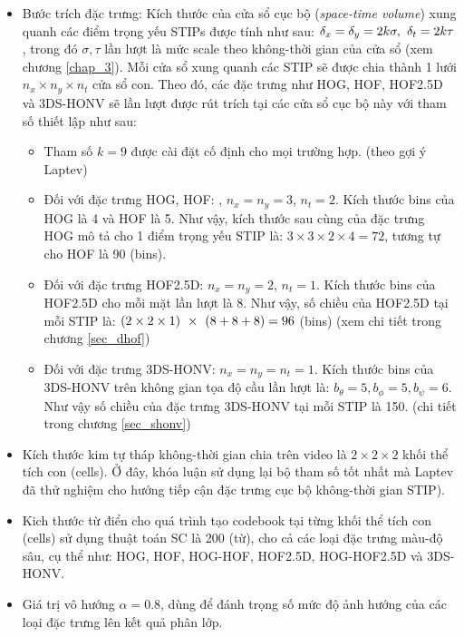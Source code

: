 \begin{itemize}
	\item Bước trích đặc trưng: Kích thước của cửa sổ cục bộ (\textit{space-time volume}) xung quanh các điểm trọng yếu STIPs được tính như sau: $\delta_x=\delta_y=2k\sigma,\hspace{0.05in}\delta_t=2k\tau$, trong đó $\sigma, \tau$ lần lượt là mức scale theo không-thời gian của cửa sổ (xem chương \ref{chap_3}). Mỗi cửa sổ xung quanh các STIP sẽ được chia thành 1 lưới $n_x \times n_y\times n_t$ cửa sổ con. Theo đó, các đặc trưng như HOG, HOF, HOF2.5D và 3DS-HONV sẽ lần lượt được rút trích tại các cửa sổ cục bộ này với tham số thiết lập như sau: 
		\begin{itemize} 
			\item Tham số $k=9$ được cài đặt cố định cho mọi trường hợp. (theo gợi ý Laptev\cite{LMSR08})
			\item Đối với đặc trưng HOG, HOF: , $n_x = n_y = 3$, $n_t = 2$. Kích thước bins của HOG là 4 và HOF là 5. Như vậy, kích thước sau cùng của đặc trưng HOG mô tả cho 1 điểm trọng yếu STIP là: $3\times 3\times2\times4 = 72$, tương tự cho HOF là 90 (bins). 
			\item Đối với đặc trưng HOF2.5D: $n_x = n_y = 2$, $n_t=1$. Kích thước bins của HOF2.5D cho mỗi mặt lần lượt là 8. Như vậy, số chiều của HOF2.5D tại mỗi STIP là: $(2\times2\times1)\hspace{0.05in}\times\hspace{0.05in}(8+8+8)=96$ (bins) (xem chi tiết trong chương \ref{sec_dhof})
			\item Đối với đặc trưng 3DS-HONV: $n_x = n_y = n_t = 1$. Kích thước bins của 3DS-HONV trên không gian tọa độ cầu lần lượt là: $b_\theta=5,b_\phi=5,b_\psi=6$. Như vậy số chiều của đặc trưng 3DS-HONV tại mỗi STIP là 150. (chi tiết trong chương \ref{sec_shonv})
		\end{itemize}
	\item Kích thước kim tự tháp không-thời gian chia trên video là $2\times2\times2$ khối thể tích con (cells). Ở đây, khóa luận sử dụng lại bộ tham số tốt nhất mà Laptev đã thử nghiệm cho hướng tiếp cận đặc trưng cục bộ không-thời gian STIP\cite{LMSR08}). 
	\item Kich thước từ điển cho quá trình tạo codebook tại từng khối thể tích con (cells) sử dụng thuật toán SC là 200 (từ), cho cả các loại đặc trưng màu-độ sâu, cụ thể như: HOG, HOF, HOG-HOF, HOF2.5D, HOG-HOF2.5D và 3DS-HONV. 
	\item Giá trị vô hướng $\alpha=0.8$, dùng để đánh trọng số mức độ ảnh hướng của các loại đặc trưng lên kết quả phân lớp.
\end{itemize}

